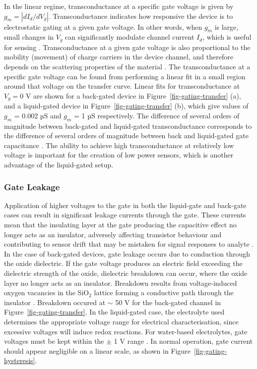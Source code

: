 \documentclass[
  a4paper,
]{scrbook}
\begin{document}
In the linear regime, transconductance at a specific gate voltage is
given by \(g_m = |dI_{d}/dV_g|\). Transconductance indicates how
responsive the device is to electrostatic gating at a given gate
voltage. In other words, when \(g_m\) is large, small changes in \(V_g\)
can significantly modulate channel current \(I_d\), which is useful for
sensing \autocite{Heller2009a,Ohno2015,Kireev2017}. Transconductance at
a given gate voltage is also proportional to the mobility (movement) of
charge carriers in the device channel, and therefore depends on the
scattering properties of the material
\autocite{Rouhi2010,Petti2016,Li2023}. The transconductance at a
specific gate voltage can be found from performing a linear fit in a
small region around that voltage on the transfer curve. Linear fits for
transconductance at \(V_g = 0\) V are shown for a back-gated device in
Figure~\ref{fig-gating-transfer} (a), and a liquid-gated device in
Figure~\ref{fig-gating-transfer} (b), which give values of \(g_m\) =
0.002 µS and \(g_m\) = 1 µS respectively. The difference of several
orders of magnitude between back-gated and liquid-gated transconductance
corresponds to the difference of several orders of magnitude between
back and liquid-gated gate capacitance \autocite{Tran2016,Shkodra2021}.
The ability to achieve high transconductance at relatively low voltage
is important for the creation of low power sensors, which is another
advantage of the liquid-gated setup.

\hypertarget{gate-leakage}{%
\subsubsection*{Gate Leakage}\label{gate-leakage}}

Application of higher voltages to the gate in both the liquid-gate and
back-gate cases can result in significant leakage currents through the
gate. These currents mean that the insulating layer at the gate
producing the capacitive effect no longer acts as an insulator,
adversely affecting transistor behaviour and contributing to sensor
drift that may be mistaken for signal responses to analyte
\autocite{Noyce2019,Shkodra2021,Albarghouthi2022}. In the case of
back-gated devices, gate leakage occurs due to conduction through the
oxide dielectric. If the gate voltage produces an electric field
exceeding the dielectric strength of the oxide, dielectric breakdown can
occur, where the oxide layer no longer acts as an insulator. Breakdown
results from voltage-induced oxygen vacancies in the SiO\(_2\) lattice
forming a conductive path through the insulator \autocite{Padovani2017}.
Breakdown occured at \(\sim\) 50 V for the back-gated channel in
Figure~\ref{fig-gating-transfer}. In the liquid-gated case, the
electrolyte used determines the appropriate voltage range for electrical
characterisation, since excessive voltages will induce redox reactions.
For water-based electrolytes, gate voltages must be kept within the
\(\pm\) 1 V range \autocite{Wang2010,Ohno2015,Shkodra2021}. In normal
operation, gate current should appear negligible on a linear scale, as
shown in Figure~\ref{fig-gating-hysteresis}.
\end{document}
